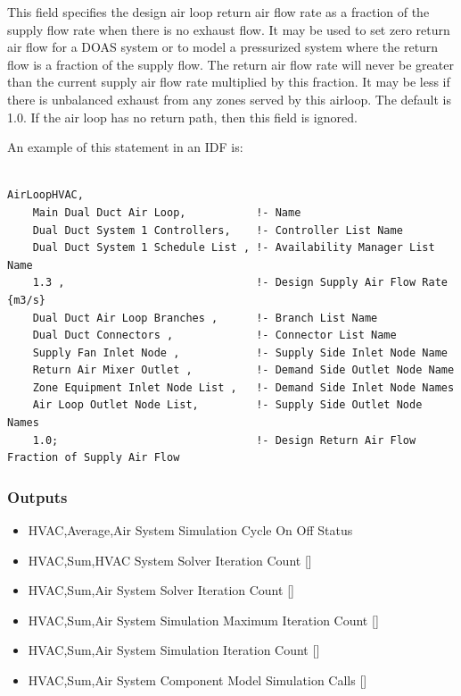 This field specifies the design air loop return air flow rate as a fraction of the supply flow rate when there is no exhaust flow.  It may be used to set zero return air flow for a DOAS system or to model a pressurized system where the return flow is a fraction of the supply flow. The return air flow rate will never be greater than the current supply air flow rate multiplied by this fraction.  It may be less if there is unbalanced exhaust from any zones served by this airloop. The default is 1.0. If the air loop has no return path, then this field is ignored.

An example of this statement in an IDF is:

\begin{lstlisting}

AirLoopHVAC,
    Main Dual Duct Air Loop,           !- Name
    Dual Duct System 1 Controllers,    !- Controller List Name
    Dual Duct System 1 Schedule List , !- Availability Manager List Name
    1.3 ,                              !- Design Supply Air Flow Rate {m3/s}
    Dual Duct Air Loop Branches ,      !- Branch List Name
    Dual Duct Connectors ,             !- Connector List Name
    Supply Fan Inlet Node ,            !- Supply Side Inlet Node Name
    Return Air Mixer Outlet ,          !- Demand Side Outlet Node Name
    Zone Equipment Inlet Node List ,   !- Demand Side Inlet Node Names
    Air Loop Outlet Node List,         !- Supply Side Outlet Node Names
    1.0;                               !- Design Return Air Flow Fraction of Supply Air Flow
\end{lstlisting}

\subsubsection{Outputs}\label{outputs-001}

\begin{itemize}
\item
  HVAC,Average,Air System Simulation Cycle On Off Status
\item
  HVAC,Sum,HVAC System Solver Iteration Count {[]}
\item
  HVAC,Sum,Air System Solver Iteration Count {[]}
\item
  HVAC,Sum,Air System Simulation Maximum Iteration Count {[]}
\item
  HVAC,Sum,Air System Simulation Iteration Count {[]}
\item
  HVAC,Sum,Air System Component Model Simulation Calls {[]}
\end{itemize}

